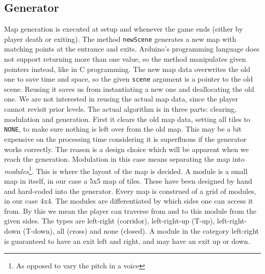 \subsection*{Generator} %
Map generation is executed at setup and whenever the game ends (either by player death or exiting). The method {\tt newScene} generates a new map with matching points at the entrance and exits. Arduino's programming language does not support returning more than one value, so the method manipulates given pointers instead, like in C programming. The new map data overwrites the old one to save time and space, so the given {\tt scene} argument is a pointer to the old scene.  Reusing it saves us from instantiating a new one and deallocating the old one.  We are not interested in reusing the actual map data, since the player cannot revisit prior levels.
\newline
The actual algorithm is in three parts: clearing, modulation and generation. First it clears the old map data, setting all tiles to {\tt NONE}, to make sure nothing is left over from the old map. This may be a bit expensive on the processing time considering it is superfluous if the generator works correctly. The reason is a design choice which will be apparent when we reach the generation. %
\newline
Modulation in this case means separating the map into \emph{modules}\footnote{As opposed to vary the pitch in a voice}. This is where the layout of the map is decided. A module is a small map in itself, in our case a 5x5 map of tiles.  These have been designed by hand and hard-coded into the generator. Every map is construed of a grid of modules, in our case 4x4. The modules are differentiated by which sides one can access it from.  By this we mean the player can traverse from and to this module from the given sides.  The types are left-right (corridor), left-right-up (T-up), left-right-down (T-down), all (cross) and none (closed). A module in the category left-right is guaranteed to have an exit left and right, and may have an exit up or down.
\newline
